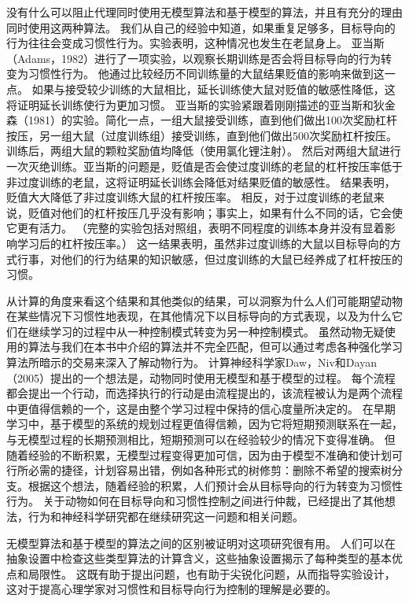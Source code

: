 {{{{{{{{{{{{{没有什么可以阻止代理同时使用无模型算法和基于模型的算法，并且有充分的理由同时使用这两种算法。
我们从自己的经验中知道，如果重复足够多，目标导向的行为往往会变成习惯性行为。实验表明，这种情况也发生在老鼠身上。
亚当斯（Adams，1982）进行了一项实验，以观察长期训练是否会将目标导向的行为转变为习惯性行为。
他通过比较经历不同训练量的大鼠结果贬值的影响来做到这一点。
如果与接受较少训练的大鼠相比，延长训练使大鼠对贬值的敏感性降低，这将证明延长训练使行为更加习惯。
亚当斯的实验紧跟着刚刚描述的亚当斯和狄金森（1981）的实验。简化一点，一组大鼠接受训练，直到他们做出100次奖励杠杆按压，另一组大鼠（过度训练组）接受训练，直到他们做出500次奖励杠杆按压。
训练后，两组大鼠的颗粒奖励值均降低（使用氯化锂注射）。
然后对两组大鼠进行一次灭绝训练。亚当斯的问题是，贬值是否会使过度训练的老鼠的杠杆按压率低于非过度训练的老鼠，这将证明延长训练会降低对结果贬值的敏感性。
结果表明，贬值大大降低了非过度训练大鼠的杠杆按压率。
相反，对于过度训练的老鼠来说，贬值对他们的杠杆按压几乎没有影响；事实上，如果有什么不同的话，它会使它更有活力。
（完整的实验包括对照组，表明不同程度的训练本身并没有显着影响学习后的杠杆按压率。）
这一结果表明，虽然非过度训练的大鼠以目标导向的方式行事，对他们的行为结果的知识敏感，但过度训练的大鼠已经养成了杠杆按压的习惯。



从计算的角度来看这个结果和其他类似的结果，可以洞察为什么人们可能期望动物在某些情况下习惯性地表现，在其他情况下以目标导向的方式表现，以及为什么它们在继续学习的过程中从一种控制模式转变为另一种控制模式。
虽然动物无疑使用的算法与我们在本书中介绍的算法并不完全匹配，但可以通过考虑各种强化学习算法所暗示的交易来深入了解动物行为。
计算神经科学家Daw，Niv和Dayan（2005）提出的一个想法是，动物同时使用无模型和基于模型的过程。
每个流程都会提出一个行动，而选择执行的行动是由流程提出的，该流程被认为是两个流程中更值得信赖的一个，这是由整个学习过程中保持的信心度量所决定的。
在早期学习中，基于模型的系统的规划过程更值得信赖，因为它将短期预测联系在一起，与无模型过程的长期预测相比，短期预测可以在经验较少的情况下变得准确。
但随着经验的不断积累，无模型过程变得更加可信，因为由于模型不准确和使计划可行所必需的捷径，计划容易出错，例如各种形式的树修剪：删除不希望的搜索树分支。根据这个想法，随着经验的积累，人们预计会从目标导向的行为转变为习惯性行为。
关于动物如何在目标导向和习惯性控制之间进行仲裁，已经提出了其他想法，行为和神经科学研究都在继续研究这一问题和相关问题。


无模型算法和基于模型的算法之间的区别被证明对这项研究很有用。
人们可以在抽象设置中检查这些类型算法的计算含义，这些抽象设置揭示了每种类型的基本优点和局限性。
这既有助于提出问题，也有助于尖锐化问题，从而指导实验设计，这对于提高心理学家对习惯性和目标导向行为控制的理解是必要的。


}}}}}}}}}}}}}

